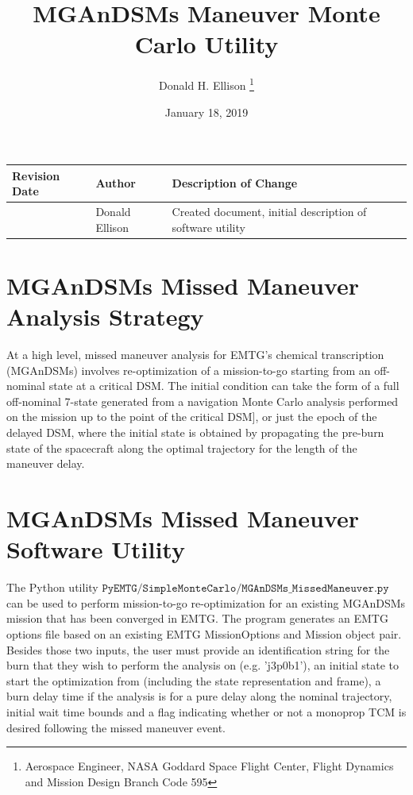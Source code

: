 \documentclass[11pt]{article}
\title{{\Huge MGAnDSMs Maneuver Monte Carlo Utility}}
\author{Donald H. Ellison \thanks{Aerospace Engineer, NASA Goddard Space Flight Center, Flight Dynamics and Mission Design Branch Code 595}}
\date{}
\begin{document}
\begin{titlepage}
\maketitle
\begin{table}[H]
	\centering
	\begin{tabular}{|l|l|l|}
		\hline
		\textbf{Revision Date} & \textbf{Author} & \textbf{Description of Change} \\ \hline
		\date{January 18, 2019} & Donald Ellison & Created document, initial description of software utility \\
		\hline
	\end{tabular}
\end{table}
\end{titlepage}



\newpage
\tableofcontents
\thispagestyle{empty}
\newpage

\clearpage
\setcounter{page}{1}



\section{MGAnDSMs Missed Maneuver Analysis Strategy}
\label{sec:missedManeuverAnalysis}

At a high level, missed maneuver analysis for EMTG's chemical transcription (\ac{MGAnDSMs}) involves re-optimization of a mission-to-go starting from an off-nominal state at a critical \ac{DSM}. The initial condition can take the form of a full off-nominal 7-state generated from a navigation Monte Carlo analysis performed on the mission up to the point of the critical \ac{DSM}], or just the epoch of the delayed \ac{DSM}, where the initial state is obtained by propagating the pre-burn state of the spacecraft along the optimal trajectory for the length of the maneuver delay.

\section{MGAnDSMs Missed Maneuver Software Utility}

The Python utility $\mathtt{PyEMTG/SimpleMonteCarlo/MGAnDSMs\_MissedManeuver.py}$ can be used to perform mission-to-go re-optimization for an existing \ac{MGAnDSMs} mission that has been converged in EMTG. The program generates an EMTG options file based on an existing EMTG MissionOptions and Mission object pair. Besides those two inputs, the user must provide an identification string for the burn that they wish to perform the analysis on (e.g. 'j3p0b1'), an initial state to start the optimization from (including the state representation and frame), a burn delay time if the analysis is for a pure delay along the nominal trajectory, initial wait time bounds and a flag indicating whether or not a monoprop TCM is desired following the missed maneuver event.
\end{document}
